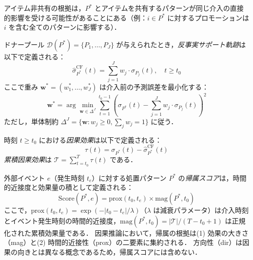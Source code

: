 アイテム非共有の根拠は，$P^*$ とアイテムを共有するパターンが同じ介入の直接的影響を受ける可能性があることにある（例：$i \in P^*$ に対するプロモーションは $i$ を含む全てのパターンに影響する）．

\begin{definition}[反事実サポート軌跡]
\label{def:counterfactual}
ドナープール $\mathcal{D}(P^*) = \{P_1, \ldots, P_J\}$ が与えられたとき，\emph{反事実サポート軌跡}は以下で定義される：
\begin{equation}
    \hat{\sigma}_{P^*}^{\mathrm{CF}}(t) = \sum_{j=1}^{J} w_j \cdot \sigma_{P_j}(t), \quad t \geq t_0
\end{equation}
ここで重み $\mathbf{w}^* = (w_1^*, \ldots, w_J^*)$ は介入前の予測誤差を最小化する：
\begin{equation}
    \mathbf{w}^* = \arg\min_{\mathbf{w} \in \Delta^J} \sum_{t=1}^{t_0-1} \left(\sigma_{P^*}(t) - \sum_{j=1}^{J} w_j \cdot \sigma_{P_j}(t)\right)^2
    \label{eq:weight-opt}
\end{equation}
ただし，単体制約 $\Delta^J = \{\mathbf{w} : w_j \geq 0, \sum_j w_j = 1\}$ に従う．
\end{definition}

\begin{definition}[サポートに対する因果効果]
\label{def:causal-effect}
時刻 $t \geq t_0$ における\emph{因果効果}は以下で定義される：
\begin{equation}
    \tau(t) = \sigma_{P^*}(t) - \hat{\sigma}_{P^*}^{\mathrm{CF}}(t)
\end{equation}
\emph{累積因果効果}は $\mathcal{T} = \sum_{t=t_0}^{T} \tau(t)$ である．
\end{definition}

\begin{definition}[帰属スコア]
\label{def:attribution-score}
外部イベント $e$（発生時刻 $t_e$）に対する処置パターン $P^*$ の\emph{帰属スコア}は，時間的近接度と効果量の積として定義される：
\begin{equation}
    \mathrm{Score}(P^*, e) = \mathrm{prox}(t_0, t_e) \times \mathrm{mag}(P^*, t_0)
\end{equation}
ここで，$\mathrm{prox}(t_0, t_e) = \exp(-|t_0 - t_e| / \lambda)$（$\lambda$ は減衰パラメータ）は介入時刻とイベント発生時刻の時間的近接度，$\mathrm{mag}(P^*, t_0) = |\mathcal{T}| / (T - t_0 + 1)$ は正規化された累積効果量である．
因果推論において，帰属の根拠は(1) 効果の大きさ（mag）と(2) 時間的近接性（prox）の二要素に集約される．
方向性（dir）は因果の向きとは異なる概念であるため，帰属スコアには含めない．
\end{definition}

